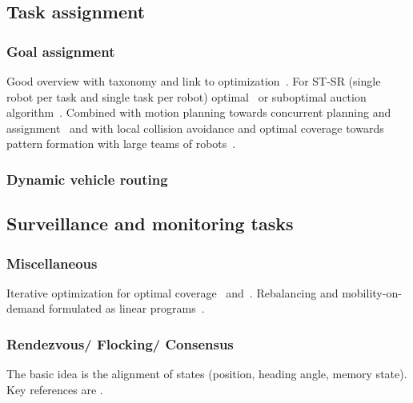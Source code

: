 
\subsection{Task assignment}

\subsubsection{Goal assignment}
Good overview with taxonomy and link to optimization~\cite{Gerkey:2004il}. For ST-SR (single robot per task and single task per robot) optimal~\cite{kuhn55} or suboptimal auction algorithm~\cite{Bertsekas:1992wx}.
Combined with motion planning towards concurrent planning and assignment~\cite{Turpin:2014bu} and with local collision avoidance and optimal coverage towards pattern formation with large teams of robots~\cite{alonsomora12ijrr}.

\subsubsection{Dynamic vehicle routing} \cite{Bullo.Frazzoli.ea:PIEEE10}

\subsection{Surveillance and monitoring tasks}

\subsubsection{Miscellaneous}
Iterative optimization for optimal coverage~\cite{cortes04} and~\cite{Schwager:2009fz}. Rebalancing and mobility-on-demand formulated as linear programs~\cite{Smith:2013fa}.

\subsubsection{Rendezvous/ Flocking/ Consensus} The basic idea is the alignment of states (position, heading angle, memory state). Key references are \cite{Cortes.Martinez.ea:06,Jadbabaie.Lin.ea:03}.

